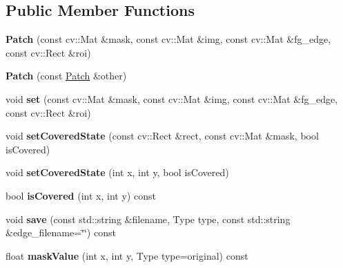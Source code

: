 \subsection*{Public Member Functions}
\begin{DoxyCompactItemize}
\item 
\hypertarget{classskl_1_1_patch_a410b66fe8fd29cb6d6ba3498414d4412}{}\label{classskl_1_1_patch_a410b66fe8fd29cb6d6ba3498414d4412} 
{\bfseries Patch} (const cv\+::\+Mat \&mask, const cv\+::\+Mat \&img, const cv\+::\+Mat \&fg\+\_\+edge, const cv\+::\+Rect \&roi)
\item 
\hypertarget{classskl_1_1_patch_ac5515855c4eba975b606e076b3471d15}{}\label{classskl_1_1_patch_ac5515855c4eba975b606e076b3471d15} 
{\bfseries Patch} (const \hyperlink{classskl_1_1_patch}{Patch} \&other)
\item 
\hypertarget{classskl_1_1_patch_a045692d09e5943b36b92d6586e9b3106}{}\label{classskl_1_1_patch_a045692d09e5943b36b92d6586e9b3106} 
void {\bfseries set} (const cv\+::\+Mat \&mask, const cv\+::\+Mat \&img, const cv\+::\+Mat \&fg\+\_\+edge, const cv\+::\+Rect \&roi)
\item 
\hypertarget{classskl_1_1_patch_a263bb2f0f54409f887615bfeedb7228a}{}\label{classskl_1_1_patch_a263bb2f0f54409f887615bfeedb7228a} 
void {\bfseries set\+Covered\+State} (const cv\+::\+Rect \&rect, const cv\+::\+Mat \&mask, bool is\+Covered)
\item 
\hypertarget{classskl_1_1_patch_abdd8faf6f581904c29858be0bf672c9b}{}\label{classskl_1_1_patch_abdd8faf6f581904c29858be0bf672c9b} 
void {\bfseries set\+Covered\+State} (int x, int y, bool is\+Covered)
\item 
\hypertarget{classskl_1_1_patch_a82c113e89db9a30a62e91b223ccc9e76}{}\label{classskl_1_1_patch_a82c113e89db9a30a62e91b223ccc9e76} 
bool {\bfseries is\+Covered} (int x, int y) const
\item 
\hypertarget{classskl_1_1_patch_a43359ea1b7386dfe745ec746c480bef9}{}\label{classskl_1_1_patch_a43359ea1b7386dfe745ec746c480bef9} 
void {\bfseries save} (const std\+::string \&filename, Type type, const std\+::string \&edge\+\_\+filename=\char`\"{}\char`\"{}) const
\item 
\hypertarget{classskl_1_1_patch_a77e6d545fa84cabeda518b986df78623}{}\label{classskl_1_1_patch_a77e6d545fa84cabeda518b986df78623} 
float {\bfseries mask\+Value} (int x, int y, Type type=original) const
\item 
\hypertarget{classskl_1_1_patch_aaee529f694b825532e2aab29b8685c94}{}\label{classskl_1_1_patch_aaee529f694b825532e2aab29b8685c94} 

\end{DoxyCompactItemize}
